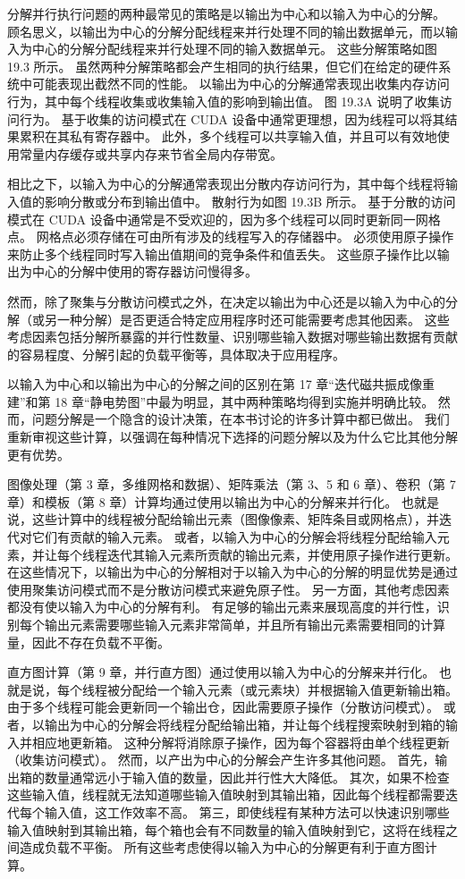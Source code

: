 分解并行执行问题的两种最常见的策略是以输出为中心和以输入为中心的分解。 顾名思义，以输出为中心的分解分配线程来并行处理不同的输出数据单元，而以输入为中心的分解分配线程来并行处理不同的输入数据单元。 这些分解策略如图 19.3 所示。 虽然两种分解策略都会产生相同的执行结果，但它们在给定的硬件系统中可能表现出截然不同的性能。 以输出为中心的分解通常表现出收集内存访问行为，其中每个线程收集或收集输入值的影响到输出值。 图 19.3A 说明了收集访问行为。 基于收集的访问模式在 CUDA 设备中通常更理想，因为线程可以将其结果累积在其私有寄存器中。 此外，多个线程可以共享输入值，并且可以有效地使用常量内存缓存或共享内存来节省全局内存带宽。

相比之下，以输入为中心的分解通常表现出分散内存访问行为，其中每个线程将输入值的影响分散或分布到输出值中。 散射行为如图 19.3B 所示。 基于分散的访问模式在 CUDA 设备中通常是不受欢迎的，因为多个线程可以同时更新同一网格点。 网格点必须存储在可由所有涉及的线程写入的存储器中。 必须使用原子操作来防止多个线程同时写入输出值期间的竞争条件和值丢失。 这些原子操作比以输出为中心的分解中使用的寄存器访问慢得多。

然而，除了聚集与分散访问模式之外，在决定以输出为中心还是以输入为中心的分解（或另一种分解）是否更适合特定应用程序时还可能需要考虑其他因素。 这些考虑因素包括分解所暴露的并行性数量、识别哪些输入数据对哪些输出数据有贡献的容易程度、分解引起的负载平衡等，具体取决于应用程序。

以输入为中心和以输出为中心的分解之间的区别在第 17 章“迭代磁共振成像重建”和第 18 章“静电势图”中最为明显，其中两种策略均得到实施并明确比较。 然而，问题分解是一个隐含的设计决策，在本书讨论的许多计算中都已做出。 我们重新审视这些计算，以强调在每种情况下选择的问题分解以及为什么它比其他分解更有优势。

图像处理（第 3 章，多维网格和数据）、矩阵乘法（第 3、5 和 6 章）、卷积（第 7 章）和模板（第 8 章）计算均通过使用以输出为中心的分解来并行化。 也就是说，这些计算中的线程被分配给输出元素（图像像素、矩阵条目或网格点），并迭代对它们有贡献的输入元素。 或者，以输入为中心的分解会将线程分配给输入元素，并让每个线程迭代其输入元素所贡献的输出元素，并使用原子操作进行更新。 在这些情况下，以输出为中心的分解相对于以输入为中心的分解的明显优势是通过使用聚集访问模式而不是分散访问模式来避免原子性。 另一方面，其他考虑因素都没有使以输入为中心的分解有利。 有足够的输出元素来展现高度的并行性，识别每个输出元素需要哪些输入元素非常简单，并且所有输出元素需要相同的计算量，因此不存在负载不平衡。

直方图计算（第 9 章，并行直方图）通过使用以输入为中心的分解来并行化。 也就是说，每个线程被分配给一个输入元素（或元素块）并根据输入值更新输出箱。 由于多个线程可能会更新同一个输出仓，因此需要原子操作（分散访问模式）。 或者，以输出为中心的分解会将线程分配给输出箱，并让每个线程搜索映射到箱的输入并相应地更新箱。 这种分解将消除原子操作，因为每个容器将由单个线程更新（收集访问模式）。 然而，以产出为中心的分解会产生许多其他问题。 首先，输出箱的数量通常远小于输入值的数量，因此并行性大大降低。 其次，如果不检查这些输入值，线程就无法知道哪些输入值映射到其输出箱，因此每个线程都需要迭代每个输入值，这工作效率不高。 第三，即使线程有某种方法可以快速识别哪些输入值映射到其输出箱，每个箱也会有不同数量的输入值映射到它，这将在线程之间造成负载不平衡。 所有这些考虑使得以输入为中心的分解更有利于直方图计算。

